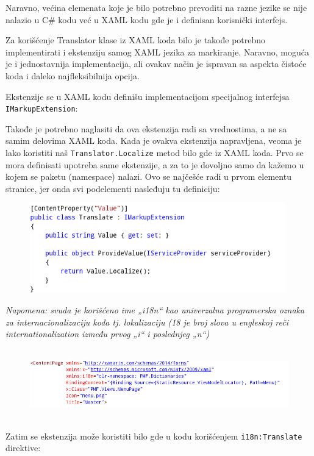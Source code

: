 \documentclass[a4paper]{article}
\begin{document}
Naravno, većina elemenata koje je bilo potrebno prevoditi na razne
jezike se nije nalazio u C\# kodu već u XAML kodu gde je i definisan
korisnički interfejs.

Za korišćenje Translator klase iz XAML koda bilo je takođe potrebno
implementirati i ekstenziju samog XAML jezika za markiranje. Naravno,
moguća je i jednostavnija implementacija, ali ovakav način je ispravan
sa aspekta čistoće koda i daleko najfleksibilnija opcija. 

Ekstenzije se u XAML kodu definišu implementacijom specijalnog
interfejsa \texttt{\textcolor[rgb]{0.0,0.4,0.8}{IMarkupExtension}}:

Takođe je potrebno naglasiti da ova ekstenzija radi sa vrednostima, a ne
sa samim delovima XAML koda. Kada je ovakva ekstenzija napravljena,
veoma je lako koristiti naš
\texttt{\textcolor[rgb]{0.0,0.4,0.8}{Translator.Localize}} metod bilo
gde iz XAML koda. Prvo se mora definisati upotreba same ekstenzije, a
za to je dovoljno samo da kažemo u kojem se paketu (namespace) nalazi.
Ovo se najčešće radi u prvom elementu stranice, jer onda svi
podelementi nasleđuju tu definiciju:

\begin{figure}
\centering
\includegraphics[width=110.95mm,height=38.96mm]{msc-img54.png}
\end{figure}
{\itshape
Napomena: svuda je korišćeno ime „i18n“ kao univerzalna programerska
oznaka za internacionalizaciju koda tj. lokalizaciju (18 je broj slova
u engleskoj reči internationalization između prvog „i“ i poslednjeg
„n“)}

\begin{figure}
\centering
\includegraphics[width=170mm,height=30.43mm]{msc-img55.png}
\end{figure}
Zatim se ekstenzija može koristiti bilo gde u kodu korišćenjem
\texttt{\textcolor[rgb]{0.0,0.4,0.8}{i18n:Translate}} direktive:
\end{document}
